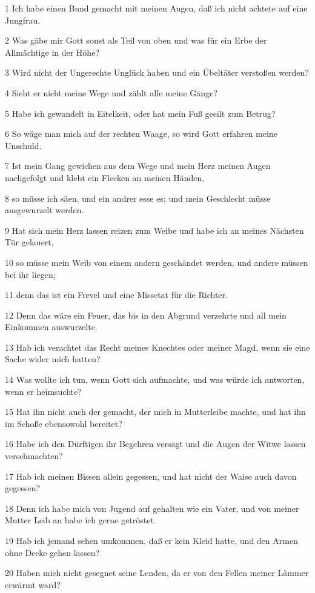 \par 1 Ich habe einen Bund gemacht mit meinen Augen, daß ich nicht achtete auf eine Jungfrau.
\par 2 Was gäbe mir Gott sonst als Teil von oben und was für ein Erbe der Allmächtige in der Höhe?
\par 3 Wird nicht der Ungerechte Unglück haben und ein Übeltäter verstoßen werden?
\par 4 Sieht er nicht meine Wege und zählt alle meine Gänge?
\par 5 Habe ich gewandelt in Eitelkeit, oder hat mein Fuß geeilt zum Betrug?
\par 6 So wäge man mich auf der rechten Waage, so wird Gott erfahren meine Unschuld.
\par 7 Ist mein Gang gewichen aus dem Wege und mein Herz meinen Augen nachgefolgt und klebt ein Flecken an meinen Händen,
\par 8 so müsse ich säen, und ein andrer esse es; und mein Geschlecht müsse ausgewurzelt werden.
\par 9 Hat sich mein Herz lassen reizen zum Weibe und habe ich an meines Nächsten Tür gelauert,
\par 10 so müsse mein Weib von einem andern geschändet werden, und andere müssen bei ihr liegen;
\par 11 denn das ist ein Frevel und eine Missetat für die Richter.
\par 12 Denn das wäre ein Feuer, das bis in den Abgrund verzehrte und all mein Einkommen auswurzelte.
\par 13 Hab ich verachtet das Recht meines Knechtes oder meiner Magd, wenn sie eine Sache wider mich hatten?
\par 14 Was wollte ich tun, wenn Gott sich aufmachte, und was würde ich antworten, wenn er heimsuchte?
\par 15 Hat ihn nicht auch der gemacht, der mich in Mutterleibe machte, und hat ihn im Schoße ebensowohl bereitet?
\par 16 Habe ich den Dürftigen ihr Begehren versagt und die Augen der Witwe lassen verschmachten?
\par 17 Hab ich meinen Bissen allein gegessen, und hat nicht der Waise auch davon gegessen?
\par 18 Denn ich habe mich von Jugend auf gehalten wie ein Vater, und von meiner Mutter Leib an habe ich gerne getröstet.
\par 19 Hab ich jemand sehen umkommen, daß er kein Kleid hatte, und den Armen ohne Decke gehen lassen?
\par 20 Haben mich nicht gesegnet seine Lenden, da er von den Fellen meiner Lämmer erwärmt ward?
